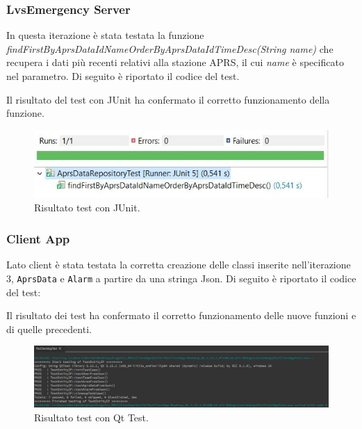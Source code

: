 \subsubsection{LvsEmergency Server}
In questa iterazione è stata testata la funzione \textit{findFirstByAprsDataIdNameOrderByAprsDataIdTimeDesc(String name)} che recupera i dati più recenti relativi alla stazione APRS, il cui \textit{name} è specificato nel parametro. Di seguito è riportato il codice del test.



Il risultato del test con JUnit ha confermato il corretto funzionamento della funzione.

\begin{figure}[h!]
	\centering
	\includegraphics[width=0.6\linewidth]{./Iterazione 3/ImageFiles/TestJUnit}
	\caption{Risultato test con JUnit.}
	\label{fig:RisultatiTestJunitIT3}
\end{figure}

\clearpage

\subsubsection{Client App}
Lato client è stata testata la corretta creazione delle classi inserite nell'iterazione 3, \texttt{AprsData} e \texttt{Alarm} a partire da una stringa Json. Di seguito è riportato il codice del test: 



Il risultato dei test ha confermato il corretto funzionamento delle nuove funzioni e di quelle precedenti. 

\begin{figure}[h!]
	\centering
	\includegraphics[width=1\linewidth]{./Iterazione 3/ImageFiles/testQt}
	\caption{Risultato test con Qt Test.}
	\label{fig:RisultatiTestQtIT3}
\end{figure}
\clearpage

